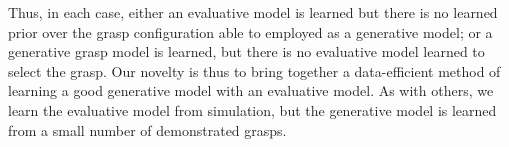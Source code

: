 Thus, in each case, either an evaluative model is learned but there is no learned prior over the grasp configuration able to employed as a generative model; or a generative grasp model is learned, but there is no evaluative model learned to select the grasp. Our novelty is thus to bring together a data-efficient method of learning a good generative model with an evaluative model. As with others, we learn the evaluative model from simulation, but the generative model is learned from a small number of demonstrated grasps. 


%
%
%
